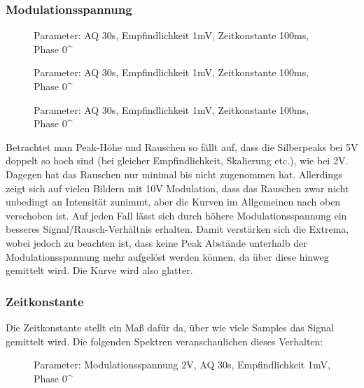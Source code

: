 	\subsubsection{Modulationsspannung} %
	\label{ssub:modulationsspannung}
	
		\begin{figure}[H]
			\center
			
			\caption{\centering Parameter: AQ 30s, Empfindlichkeit 1mV, Zeitkonstante 100ms, Phase 0^\circ}
		\end{figure}

		\begin{figure}[H]
			\center
			
			\caption{\centering Parameter: AQ 30s, Empfindlichkeit 1mV, Zeitkonstante 100ms, Phase 0^\circ}	
		\end{figure}

		\begin{figure}[H]
			\center
			
			\caption{\centering Parameter: AQ 30s, Empfindlichkeit 1mV, Zeitkonstante 100ms, Phase 0^\circ}
		\end{figure}
	
		Betrachtet man Peak-Höhe und Rauschen so fällt auf, dass die Silberpeaks bei 5V doppelt so hoch sind (bei gleicher Empfindlichkeit, Skalierung etc.), wie bei 2V.
		Dagegen hat das Rauschen nur minimal bis nicht zugenommen hat. 
		Allerdings zeigt sich auf vielen Bildern mit 10V Modulation, dass das Rauschen zwar nicht unbedingt an Intensität zunimmt, aber die Kurven im Allgemeinen nach oben verschoben ist. 
		Auf jeden Fall lässt sich durch höhere Modulationsspannung ein besseres Signal/Rausch-Verhältnis erhalten.
		Damit verstärken sich die Extrema, wobei jedoch zu beachten ist, dass keine Peak Abstände unterhalb der Modulationsspannung mehr aufgelöst werden können, da über diese hinweg gemittelt wird. 
		Die Kurve wird also glatter.


	\subsubsection{Zeitkonstante} %
	\label{ssub:zeitkonstante}
	
		Die Zeitkonstante stellt ein Maß dafür da, über wie viele Samples das Signal gemittelt wird.
		Die folgenden Spektren veranschaulichen dieses Verhalten:

		\begin{figure}[H]
			\center
			
			\caption{\centering Parameter: Modulationsspannung 2V, AQ 30s, Empfindlichkeit 1mV, Phase 0^\circ}
		\end{figure}

